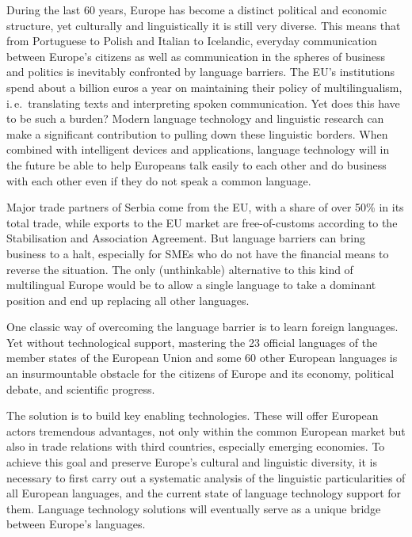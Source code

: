 \begin{multicols}{2}

    
During the last 60 years, Europe has become a distinct political and economic structure, yet culturally and linguistically it is still very diverse. This means that from Portuguese to Polish and Italian to Icelandic, everyday communication between Europe’s citizens as well as communication in the spheres of business and politics is inevitably confronted by language barriers. The EU’s institutions spend about a billion euros a year on maintaining their policy of multilingualism, i.\,e.~translating texts and interpreting spoken communication. Yet does this have to be such a burden? Modern language technology and linguistic research can make a significant contribution to pulling down these linguistic borders. When combined with intelligent devices and applications, language technology will in the future be able to help Europeans talk easily to each other and do business with each other even if they do not speak a common language. 


Major trade partners of Serbia come from the EU, with a share of over 50\% in its total trade, while exports to the EU market are free-of-customs according to the Stabilisation and Association Agreement. But language barriers can bring business to a halt, especially for SMEs who do not have the financial means to reverse the situation. The only (unthinkable) alternative to this kind of multilingual Europe would be to allow a single language to take a dominant position and end up replacing all other languages. 

One classic way of overcoming the language barrier is to learn foreign languages. Yet without technological support, mastering the 23 official languages of the member states of the European Union and some 60 other European languages is an insurmountable obstacle for the citizens of Europe and its economy, political debate, and scientific progress.   

The solution is to build key enabling technologies. These will offer European actors tremendous advantages, not only within the common European market but also in trade relations with third countries, especially emerging economies.  To achieve this goal and preserve Europe’s cultural and linguistic diversity, it is necessary to first carry out a systematic analysis of the linguistic particularities of all European languages, and the current state of language technology support for them. Language technology solutions will eventually serve as a unique bridge between Europe’s languages. 


\end{multicols}
